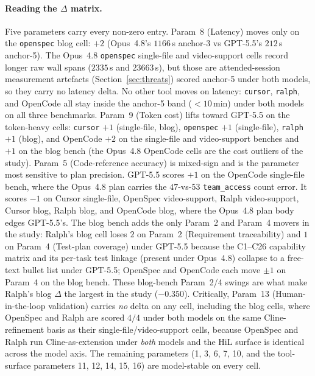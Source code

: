 \paragraph{Reading the $\Delta$ matrix.} Five parameters carry every
non-zero entry. Param~8 (Latency) moves only on the \texttt{openspec}
blog cell: $+2$ (Opus~4.8's $1166$\,s anchor-3 vs GPT-5.5's $212$\,s
anchor-5). The Opus~4.8 \texttt{openspec} single-file and video-support
cells record longer raw wall spans ($2335$\,s and $23663$\,s), but
those are attended-session measurement artefacts (Section~\ref{sec:threats})
scored anchor-5 under both models, so they carry no latency delta. No
other tool moves on latency: \texttt{cursor},
\texttt{ralph}, and OpenCode all stay inside the anchor-5 band
($<10$\,min) under both models on all three benchmarks. Param~9
(Token cost) lifts toward GPT-5.5 on the token-heavy cells:
\texttt{cursor} $+1$ (single-file, blog), \texttt{openspec} $+1$ (single-file),
\texttt{ralph} $+1$ (blog), and OpenCode $+2$ on the single-file and
video-support benches and $+1$ on the blog bench (the Opus~4.8 OpenCode cells
are the cost outliers of the study). Param~5 (Code-reference accuracy) is
mixed-sign and is the parameter most sensitive to plan precision.
GPT-5.5 scores $+1$ on the OpenCode single-file bench, where the Opus~4.8
plan carries the $47$-vs-$53$ \texttt{team\_access} count error. It
scores $-1$ on Cursor single-file, OpenSpec video-support, Ralph
video-support, Cursor blog, Ralph blog, and OpenCode blog, where the
Opus~4.8 plan body edges GPT-5.5's. The blog bench adds the only Param~2 and
Param~4 movers in the study: Ralph's blog cell loses $2$ on Param~2
(Requirement traceability) and $1$ on Param~4 (Test-plan coverage)
under GPT-5.5 because the C1--C26 capability matrix and its per-task
test linkage (present under Opus~4.8) collapse to a free-text
bullet list under GPT-5.5; OpenSpec and OpenCode each move $\pm1$ on
Param~4 on the blog bench. These blog-bench Param~2/4 swings are what
make Ralph's blog $\Delta$ the largest in the study ($-0.350$).
Critically, Param~13 (Human-in-the-loop validation) carries \emph{no}
delta on any cell, including the blog cells, where OpenSpec and
Ralph are scored $4/4$ under both models on the same Cline-refinement
basis as their single-file/video-support cells, because OpenSpec and Ralph run
Cline-as-extension under \emph{both} models and the HiL surface is
identical across the model axis. The remaining parameters (1, 3, 6, 7,
10, and the tool-surface parameters 11, 12, 14, 15, 16) are
model-stable on every cell.

